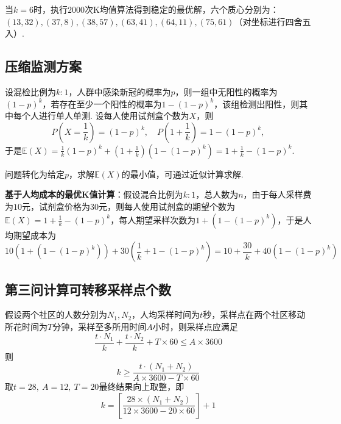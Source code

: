 \documentclass[12pt, a4paper, oneside]{ctexart}
\let\leq=\leqslant %
\let\geq=\geqslant %
\def\E{\mathbb{E}}          %
\def\add{\vspace{1ex}}      %
\begin{document}
当$k=6$时，执行$2000$次K均值算法得到稳定的最优解，六个质心分别为：\\$(13, 32), (37, 8), (38, 57), (63, 41), (64, 11), (75, 61)$（对坐标进行四舍五入）.

\subsection*{压缩监测方案}
设混检比例为$k:1$，人群中感染新冠的概率为$p$，则一组中无阳性的概率为$(1-p)^k$，若存在至少一个阳性的概率为$1-(1-p)^k$，该组检测出阳性，则其中每个人进行单人单测. 设每人使用试剂盒个数为$X$，则
\begin{equation*}
    P(X = \frac{1}{k}) = (1-p)^k,\quad P(1+\frac{1}{k})=1-(1-p)^k,
\end{equation*}
于是$\E(X) = \frac{1}{k}(1-p)^k+\left(1+\frac{1}{k}\right)(1-(1-p)^k)=1+\frac{1}{k}-(1-p)^k$.\add

问题转化为给定$p$，求解$\E(X)$的最小值，可通过近似计算求解.

\textbf{基于人均成本的最优K值计算}：假设混合比例为$k:1$，总人数为$n$，由于每人采样费为$10$元，试剂盒价格为$30$元，则每人使用试剂盒的期望个数为$\E(X)=1+\frac{1}{k}-(1-p)^k$，每人期望采样次数为$1+(1-(1-p)^k)$，于是人均期望成本为
\begin{equation*}
    10(1+(1-(1-p)^k))+30(\frac{1}{k}+1-(1-p)^k) = 10+\frac{30}{k}+40(1-(1-p)^k)
\end{equation*}

\subsection*{第三问计算可转移采样点个数}
假设两个社区的人数分别为$N_1,N_2$，人均采样时间为$t$秒，采样点在两个社区移动所花时间为$T$分钟，采样至多所用时间$A$小时，则采样点应满足
\begin{equation*}
    \frac{t\cdot N_1}{k}+\frac{t\cdot N_2}{k}+T\times 60\leq A\times 3600
\end{equation*}
则
\begin{equation*}
    k\geq \frac{t\cdot(N_1+N_2)}{A\times 3600-T\times 60}
\end{equation*}
取$t = 28,\ A = 12,\ T = 20$最终结果向上取整，即
\begin{equation*}
    k=\left[\frac{28\times(N_1+N_2)}{12\times3600-20\times 60}\right]+1
\end{equation*}
\end{document}
